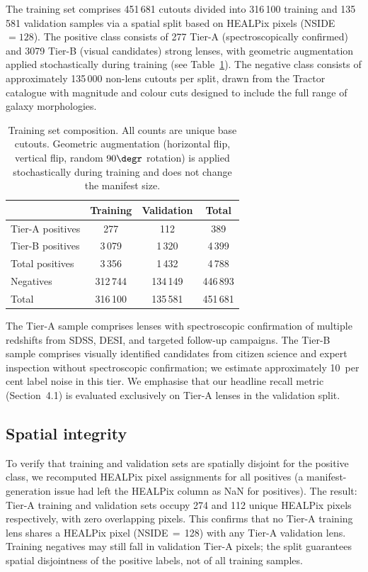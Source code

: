 \documentclass[fleqn,usenatbib]{rasti}
\begin{document}
The training set comprises 451\,681 cutouts divided into 316\,100 training and 135\,581 validation samples via a spatial split based on HEALPix pixels (NSIDE $= 128$).  The positive class consists of 277 Tier-A (spectroscopically confirmed) and 3079 Tier-B (visual candidates) strong lenses, with geometric augmentation applied stochastically during training (see Table~\ref{tab:dataset}).  The negative class consists of approximately 135\,000 non-lens cutouts per split, drawn from the Tractor catalogue with magnitude and colour cuts designed to include the full range of galaxy morphologies.

\begin{table}
\caption{Training set composition.  All counts are unique base cutouts.  Geometric augmentation (horizontal flip, vertical flip, random $90\degr$ rotation) is applied stochastically during training and does not change the manifest size.}
\label{tab:dataset}
\centering
\begin{tabular}{lccc}
\toprule
 & Training & Validation & Total \\
\midrule
Tier-A positives & 277 & 112 & 389 \\
Tier-B positives & 3\,079 & 1\,320 & 4\,399 \\
Total positives & 3\,356 & 1\,432 & 4\,788 \\
Negatives & 312\,744 & 134\,149 & 446\,893 \\
\midrule
Total & 316\,100 & 135\,581 & 451\,681 \\
\bottomrule
\end{tabular}
\end{table}

The Tier-A sample comprises lenses with spectroscopic confirmation of multiple redshifts from SDSS, DESI, and targeted follow-up campaigns.  The Tier-B sample comprises visually identified candidates from citizen science and expert inspection without spectroscopic confirmation; we estimate approximately 10~per cent label noise in this tier.  We emphasise that our headline recall metric (Section~4.1) is evaluated exclusively on Tier-A lenses in the validation split.

\subsection{Spatial integrity}

To verify that training and validation sets are spatially disjoint for the positive class, we recomputed HEALPix pixel assignments for all positives (a manifest-generation issue had left the HEALPix column as NaN for positives).  The result: Tier-A training and validation sets occupy 274 and 112 unique HEALPix pixels respectively, with zero overlapping pixels.  This confirms that no Tier-A training lens shares a HEALPix pixel (NSIDE$\,=\,$128) with any Tier-A validation lens.  Training negatives may still fall in validation Tier-A pixels; the split guarantees spatial disjointness of the positive labels, not of all training samples.
\end{document}
